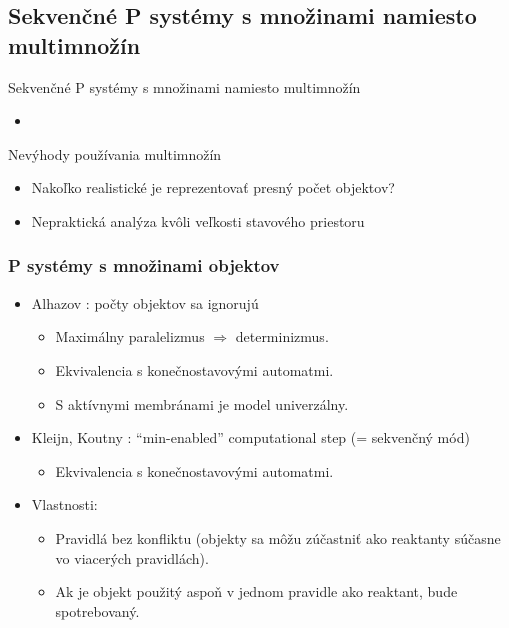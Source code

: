 
\subsection{Sekvenčné P systémy s množinami namiesto multimnožín} %
\label{sub:sekven_n_p_syst_my_s_mno_inami_namiesto_multimno_n}

\begin{frame}[t]{Sekvenčné P systémy s množinami namiesto multimnožín}
  \begin{itemize}
    \item {}
  \end{itemize}
\end{frame}

\begin{frame}[t]{Nevýhody používania multimnožín}
  \begin{itemize}
    \item Nakoľko realistické je reprezentovať presný počet objektov?
    \item Nepraktická analýza kvôli veľkosti stavového priestoru
  \end{itemize}
\end{frame}

\begin{frame}[t]\frametitle{P systémy s množinami objektov}
  \begin{itemize}
    \item Alhazov \cite{Alhazov05WithoutMultiplicities}: počty objektov sa ignorujú
    \pause
    \begin{itemize}
      \item Maximálny paralelizmus $\Rightarrow$ determinizmus.
      \pause
      \item Ekvivalencia s konečnostavovými automatmi.
      \pause
      \item S aktívnymi membránami je model univerzálny.
      \pause
    \end{itemize}
    \item Kleijn, Koutny \cite{Kleijn11SetMembrane}: ``min-enabled'' computational step (= sekvenčný mód)
    \pause
    \begin{itemize}
      \item Ekvivalencia s konečnostavovými automatmi.
    \end{itemize}
    \pause
    \item Vlastnosti:
    \begin{itemize}
      \item Pravidlá bez konfliktu (objekty sa môžu zúčastniť ako reaktanty súčasne vo viacerých pravidlách).
      \item Ak je objekt použitý aspoň v jednom pravidle ako reaktant, bude spotrebovaný.
    \end{itemize}
  \end{itemize}
\end{frame}
\note{}

